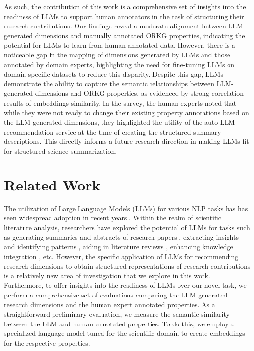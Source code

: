 As such, the contribution of this work is a comprehensive set of insights into the readiness of LLMs to support human annotators in the task of structuring their research contributions. Our findings reveal a moderate alignment between LLM-generated dimensions and manually annotated ORKG properties, indicating the potential for LLMs to learn from human-annotated data. However, there is a noticeable gap in the mapping of dimensions generated by LLMs and those annotated by domain experts, highlighting the need for fine-tuning LLMs on domain-specific datasets to reduce this disparity. Despite this gap, LLMs demonstrate the ability to capture the semantic relationships between LLM-generated dimensions and ORKG properties, as evidenced by strong correlation results of embeddings similarity. In the survey, the human experts noted that while they were not ready to change their existing property annotations based on the LLM generated dimensions, they highlighted the utility of the auto-LLM recommendation service at the time of creating the structured summary descriptions. This directly informs a future research direction in making LLMs fit for structured science summarization.


\section{Related Work}

The utilization of Large Language Models (LLMs) for various NLP tasks has has seen widespread adoption in recent years \cite{radford2018improving,brown2020language}. Within the realm of scientific literature analysis, researchers have explored the potential of LLMs for tasks such as generating summaries and abstracts of research papers \cite{cai2024sciassess,jin2024comprehensive}, extracting insights and identifying patterns \cite{liang2023can}, aiding in literature reviews \cite{antu2023using}, enhancing knowledge integration  \cite{latif2023knowledge}, etc. However, the specific application of LLMs for recommending research dimensions to obtain structured representations of research contributions is a relatively new area of investigation that we explore in this work. Furthermore, to offer insights into the readiness of LLMs over our novel task, we perform a comprehensive set of evaluations comparing the LLM-generated research dimensions and the human expert annotated properties. As a straightforward preliminary evaluation, we measure the semantic similarity between the LLM and human annotated properties. To do this, we employ a specialized language model tuned for the scientific domain to create embeddings for the respective properties.

